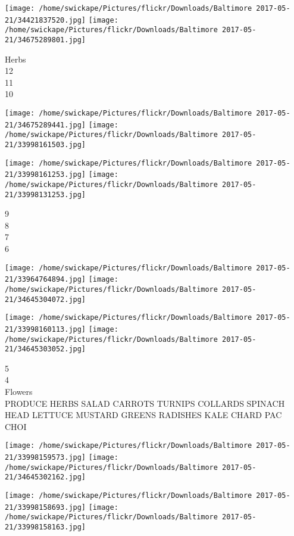 \documentclass[10pt,letterpaper]{article}
\begin{document}
\texttt{[image: /home/swickape/Pictures/flickr/Downloads/Baltimore 2017-05-21/34421837520.jpg]}
\texttt{[image: /home/swickape/Pictures/flickr/Downloads/Baltimore 2017-05-21/34675289801.jpg]}

Herbs\\
12\\
11\\
10\\
\pagebreak

\texttt{[image: /home/swickape/Pictures/flickr/Downloads/Baltimore 2017-05-21/34675289441.jpg]}
\texttt{[image: /home/swickape/Pictures/flickr/Downloads/Baltimore 2017-05-21/33998161503.jpg]}

\texttt{[image: /home/swickape/Pictures/flickr/Downloads/Baltimore 2017-05-21/33998161253.jpg]}
\texttt{[image: /home/swickape/Pictures/flickr/Downloads/Baltimore 2017-05-21/33998131253.jpg]}

9\\
8\\
7\\
6\\
\pagebreak

\texttt{[image: /home/swickape/Pictures/flickr/Downloads/Baltimore 2017-05-21/33964764894.jpg]}
\texttt{[image: /home/swickape/Pictures/flickr/Downloads/Baltimore 2017-05-21/34645304072.jpg]}

\texttt{[image: /home/swickape/Pictures/flickr/Downloads/Baltimore 2017-05-21/33998160113.jpg]}
\texttt{[image: /home/swickape/Pictures/flickr/Downloads/Baltimore 2017-05-21/34645303052.jpg]}

5\\
4\\
Flowers\\
PRODUCE HERBS SALAD CARROTS TURNIPS COLLARDS SPINACH HEAD LETTUCE MUSTARD GREENS RADISHES KALE CHARD PAC CHOI\\
\pagebreak

\texttt{[image: /home/swickape/Pictures/flickr/Downloads/Baltimore 2017-05-21/33998159573.jpg]}
\texttt{[image: /home/swickape/Pictures/flickr/Downloads/Baltimore 2017-05-21/34645302162.jpg]}

\texttt{[image: /home/swickape/Pictures/flickr/Downloads/Baltimore 2017-05-21/33998158693.jpg]}
\texttt{[image: /home/swickape/Pictures/flickr/Downloads/Baltimore 2017-05-21/33998158163.jpg]}
\end{document}

